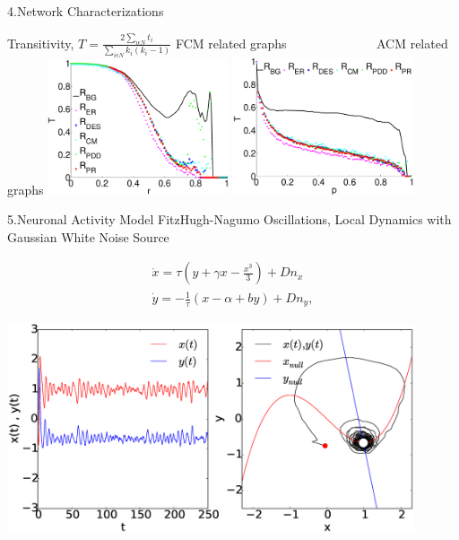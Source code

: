 \documentclass{beamer}
\begin{document}
\begin{frame}{4.Network Characterizations}

{Transitivity,  $T = \frac{2\sum\limits_{i \epsilon N}  t_i}{\sum\limits_{i \epsilon N}k_i (k_i - 1)}$ } 
\break
\break
\break
\footnotesize{FCM related graphs ~~~~~~~~~~~~~ ACM related graphs}
	\centering	
    \includegraphics[width=0.40\textwidth]{Figures/Transitivity_Fnc.eps}
	\includegraphics[width=0.40\textwidth]{Figures/Transitivity_Stru.eps} 
	
\end{frame}




\begin{frame}{5.Neuronal Activity Model}
\footnotesize{FitzHugh-Nagumo Oscillations, Local Dynamics with Gaussian White Noise Source }

\begin{subequations}
\begin{align}\dot{x} = \tau \left( y + \gamma x - \frac{x^3}{3} \right) + Dn_x  \label{eqn: frobenius 1}\\  \dot{y} = -\frac{1}{\tau} (x - \alpha + b y ) + Dn_y , \label{eqn: frobenius 2 }   \end{align} 
\end{subequations}

 \centering
 \includegraphics[width=0.9\textwidth]{Figures/FHN_noise.eps}

\end{frame}
\end{document}
